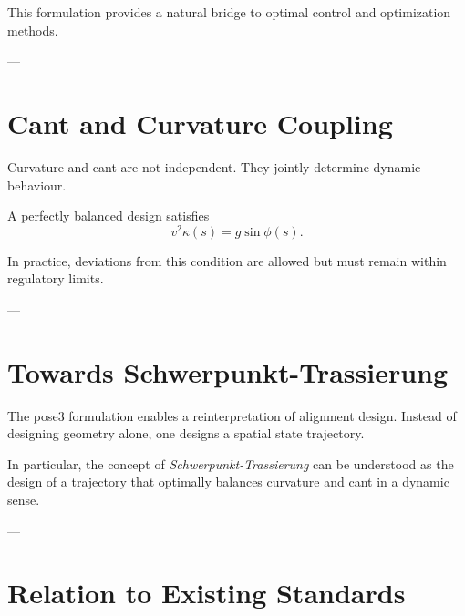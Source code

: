\begin{remark}
This formulation provides a natural bridge to optimal control and
optimization methods.
\end{remark}

---

\section{Cant and Curvature Coupling}

\begin{remark}
Curvature and cant are not independent.
They jointly determine dynamic behaviour.
\end{remark}

\begin{definition}
A perfectly balanced design satisfies
\[
v^2 \kappa(s) = g \sin\phi(s).
\]
\end{definition}

\begin{remark}
In practice, deviations from this condition are allowed but must remain
within regulatory limits.
\end{remark}

---

\section{Towards Schwerpunkt-Trassierung}

\begin{remark}
The pose3 formulation enables a reinterpretation of alignment design.
Instead of designing geometry alone, one designs a spatial state
trajectory.
\end{remark}

\begin{remark}
In particular, the concept of \emph{Schwerpunkt-Trassierung} can be
understood as the design of a trajectory that optimally balances
curvature and cant in a dynamic sense.
\end{remark}



---

\section{Relation to Existing Standards}

